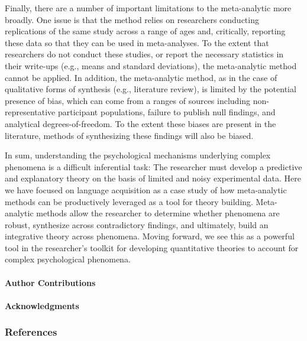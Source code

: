 \documentclass[english,floatsintext,man]{apa6}
\newcounter{author}
\begin{document}
Finally, there are a number of important limitations to the
meta-analytic more broadly. One issue is that the method relies on
researchers conducting replications of the same study across a range of
ages and, critically, reporting these data so that they can be used in
meta-analyses. To the extent that researchers do not conduct these
studies, or report the necessary statistics in their write-ups (e.g.,
means and standard deviations), the meta-analytic method cannot be
applied. In addition, the meta-analytic method, as in the case of
qualitative forms of synthesis (e.g., literature review), is limited by
the potential presence of bias, which can come from a ranges of sources
including non-representative participant populations, failure to publish
null findings, and analytical degrees-of-freedom. To the extent these
biases are present in the literature, methods of synthesizing these
findings will also be biased.

In sum, understanding the psychological mechanisms underlying complex
phenomena is a difficult inferential task: The researcher must develop a
predictive and explanatory theory on the basis of limited and noisy
experimental data. Here we have focused on language acquisition as a
case study of how meta-analytic methods can be productively leveraged as
a tool for theory building. Meta-analytic methods allow the researcher
to determine whether phenomena are robust, synthesize across
contradictory findings, and ultimately, build an integrative theory
across phenomena. Moving forward, we see this as a powerful tool in the
researcher's toolkit for developing quantitative theories to account for
complex psychological phenomena.

\paragraph{Author Contributions}\label{author-contributions}

\paragraph{Acknowledgments}\label{acknowledgments}

\newpage

\subsubsection{References}\label{references}

\setlength{\parindent}{-0.5in} \setlength{\leftskip}{0.5in}
\setlength{\parskip}{8pt}
\end{document}
